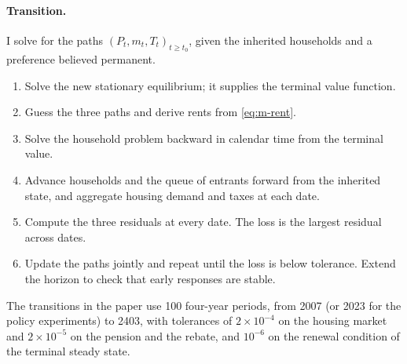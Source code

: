 \paragraph{Transition.} I solve for the paths $(P_t,m_t,T_t)_{t\geq t_0}$,
given the inherited households and a preference believed permanent.
\begin{enumerate}
\item Solve the new stationary equilibrium; it supplies the terminal value
function.
\item Guess the three paths and derive rents from \eqref{eq:m-rent}.
\item Solve the household problem backward in calendar time from the terminal
value.
\item Advance households and the queue of entrants forward from the inherited
state, and aggregate housing demand and taxes at each date.
\item Compute the three residuals at every date. The loss is the largest
residual across dates.
\item Update the paths jointly and repeat until the loss is below tolerance.
Extend the horizon to check that early responses are stable.
\end{enumerate}
The transitions in the paper use 100 four-year periods, from 2007 (or 2023
for the policy experiments) to 2403, with tolerances of $2\times10^{-4}$ on
the housing market and $2\times10^{-5}$ on the pension and the rebate, and
$10^{-6}$ on the renewal condition of the terminal steady state.
